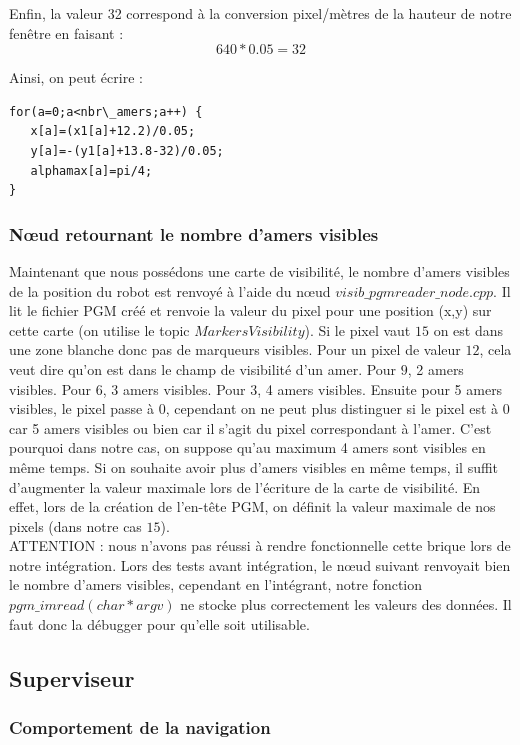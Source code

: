 \documentclass[10pt,a4paper]{article}
\begin{document}
Enfin, la valeur 32 correspond à la conversion pixel/mètres de la hauteur de notre fenêtre en faisant : $$640*0.05=32$$

\noindent Ainsi, on peut écrire :
\begin{lstlisting}
for(a=0;a<nbr\_amers;a++) {
   x[a]=(x1[a]+12.2)/0.05;  
   y[a]=-(y1[a]+13.8-32)/0.05;  
   alphamax[a]=pi/4;  
}
\end{lstlisting}

\subsubsection{Nœud retournant le nombre d'amers visibles}
Maintenant que nous possédons une carte de visibilité, le nombre d'amers visibles de la position du robot est renvoyé à l'aide du nœud $visib\_pgmreader\_node.cpp$. Il lit le fichier PGM créé et renvoie la valeur du pixel pour une position (x,y) sur cette carte (on utilise le topic $MarkersVisibility$). Si le pixel vaut $15$ on est dans une zone blanche donc pas de marqueurs visibles. Pour un pixel de valeur $12$, cela veut dire qu'on est dans le champ de visibilité d'un amer. Pour $9$, 2 amers visibles. Pour $6$, 3 amers visibles. Pour $3$, 4 amers visibles. Ensuite pour 5 amers visibles, le pixel passe à $0$, cependant on ne peut plus distinguer si le pixel est à $0$ car 5 amers visibles ou bien car il s'agit du pixel correspondant à l'amer. C'est pourquoi dans notre cas, on suppose qu'au maximum 4 amers sont visibles en même temps. 
Si on souhaite avoir plus d'amers visibles en même temps, il suffit d'augmenter la valeur maximale lors de l’écriture de la carte de visibilité. En effet, lors de la création de l’en-tête PGM, on définit la valeur maximale de nos pixels (dans notre cas $15$).\\

ATTENTION : nous n'avons pas réussi à rendre fonctionnelle cette brique lors de notre intégration. Lors des tests avant intégration, le nœud suivant renvoyait bien le nombre d'amers visibles, cependant en l'intégrant, notre fonction $pgm\_imread(char *argv)$ ne stocke plus correctement les valeurs des données. Il faut donc la débugger pour qu'elle soit utilisable.

\newpage
\subsection{Superviseur}
\label{sec:superviseur}

\subsubsection{Comportement de la navigation}
\end{document}
